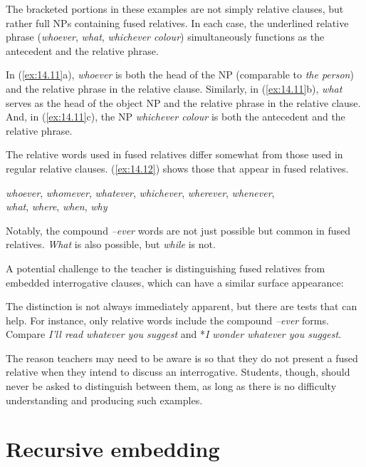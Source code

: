The bracketed portions in these examples are not simply relative clauses, but rather full NPs containing fused relatives. In each case, the underlined relative phrase (\textit{whoever}, \textit{what}, \textit{whichever colour}) simultaneously functions as the antecedent and the relative phrase.

In (\ref{ex:14.11}a), \textit{whoever} is both the head of the NP (comparable to \textit{the person}) and the relative phrase in the relative clause. Similarly, in (\ref{ex:14.11}b), \textit{what} serves as the head of the object NP and the relative phrase in the relative clause. And, in (\ref{ex:14.11}c), the NP \textit{whichever colour} is both the antecedent and the relative phrase.

The relative words used in fused relatives differ somewhat from those used in regular relative clauses. (\ref{ex:14.12}) shows those that appear in fused relatives. 

\ea \textit{whoever}, \textit{whomever}, \textit{whatever}, \textit{whichever}, \textit{wherever}, \textit{whenever}, \\\textit{what}, \textit{where}, \textit{when}, \textit{why}\label{ex:14.12}
\z

Notably, the compound \textit{--ever} words are not just possible but common in fused relatives. \textit{What} is also possible, but \textit{while} is not. 

A potential challenge to the teacher is distinguishing fused relatives from embedded interrogative clauses, which can have a similar surface appearance:
\ea \label{ex:14.14}
    \z
\z

The distinction is not always immediately apparent, but there are tests that can help. For instance, only relative words include the compound \textit{--ever} forms. Compare \textit{I'll read whatever you suggest} and *\textit{I wonder whatever you suggest}.

The reason teachers may need to be aware is so that they do not present a fused relative when they intend to discuss an interrogative. Students, though, should never be asked to distinguish between them, as long as there is no difficulty understanding and producing such examples.

\section{Recursive embedding}


